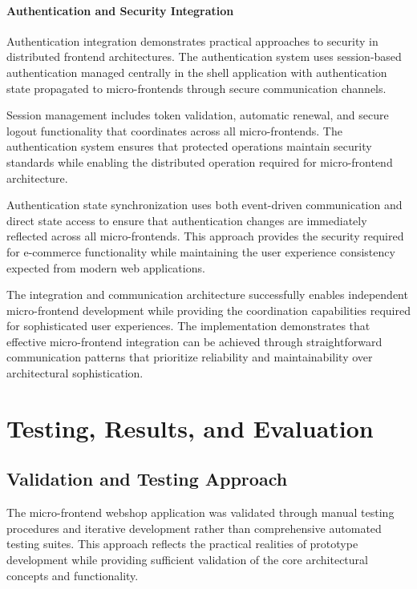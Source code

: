 \documentclass[12pt,a4paper]{report}
\begin{document}
\subsubsection{Authentication and Security Integration}

Authentication integration demonstrates practical approaches to security in distributed frontend architectures. The authentication system uses session-based authentication managed centrally in the shell application with authentication state propagated to micro-frontends through secure communication channels.

Session management includes token validation, automatic renewal, and secure logout functionality that coordinates across all micro-frontends. The authentication system ensures that protected operations maintain security standards while enabling the distributed operation required for micro-frontend architecture.

Authentication state synchronization uses both event-driven communication and direct state access to ensure that authentication changes are immediately reflected across all micro-frontends. This approach provides the security required for e-commerce functionality while maintaining the user experience consistency expected from modern web applications.

The integration and communication architecture successfully enables independent micro-frontend development while providing the coordination capabilities required for sophisticated user experiences. The implementation demonstrates that effective micro-frontend integration can be achieved through straightforward communication patterns that prioritize reliability and maintainability over architectural sophistication.

\chapter{Testing, Results, and Evaluation}
\section{Validation and Testing Approach}

The micro-frontend webshop application was validated through manual testing procedures and iterative development rather than comprehensive automated testing suites. This approach reflects the practical realities of prototype development while providing sufficient validation of the core architectural concepts and functionality.
\end{document}
